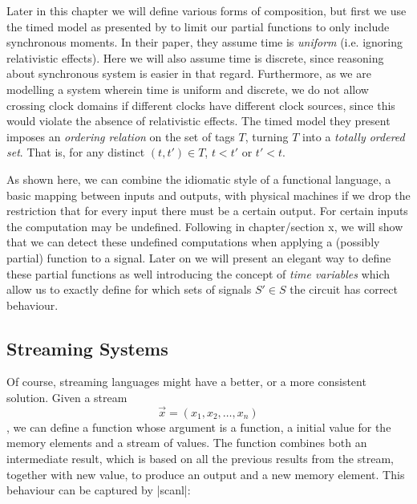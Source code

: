 Later in this chapter we will define various forms of composition, but first we use the timed model as presented by \citeauthor{lee1998framework} to limit our partial functions to only include synchronous moments.
In their paper, they assume time is \textit{uniform} (i.e. ignoring relativistic effects).
Here we will also assume time is discrete, since reasoning about synchronous system is easier in that regard.
Furthermore, as we are modelling a system wherein time is uniform and discrete, we do not allow crossing clock domains if different clocks have different clock sources, since this would violate the absence of relativistic effects.
The timed model they present imposes an \textit{ordering relation} on the set of tags $T$, turning $T$ into a \textit{totally ordered set}.
That is, for any distinct $(t,t') \in T$, $t < t'$ or $t' < t$.

As shown here, we can combine the idiomatic style of a functional language, a basic mapping between inputs and outputs, with physical machines if we drop the restriction that for every input there must be a certain output.
For certain inputs the computation may be undefined. 
Following in chapter/section x, we will show that we can detect these undefined computations when applying a (possibly partial) function to a signal. 
Later on we will present an elegant way to define these partial functions as well introducing the concept of \textit{time variables} which allow us to exactly define for which sets of signals $S' \in S$ the circuit has correct behaviour.

\subsection{Streaming Systems}
Of course, streaming languages might have a better, or a more consistent solution. 
Given a stream \[\vec x = (x_1,x_2,\ldots,x_n)\], we can define a function whose argument is a function, a initial value for the memory elements and a stream of values.
The function combines both an intermediate result, which is based on all the previous results from the stream, together with new value, to produce an output and a new memory element.
This behaviour can be captured by |scanl|:

